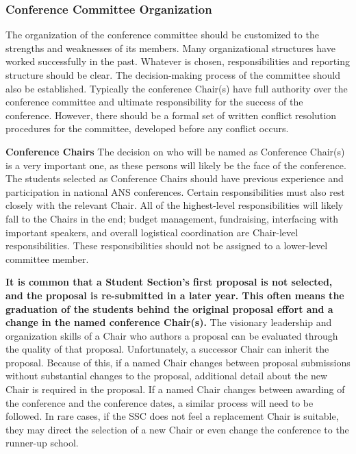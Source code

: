 \documentclass[12pt]{article}
\begin{document}
\subsubsection{Conference Committee Organization}

The organization of the conference committee should be customized to the strengths and
weaknesses of its members. Many organizational structures have worked successfully in the past. Whatever is chosen, responsibilities and reporting structure should be clear. The decision-making process of the committee should also be established. Typically the conference Chair(s) have full authority over the conference committee and ultimate responsibility for the success of the conference. However, there should be a formal set of written conflict resolution procedures for the committee, developed before any conflict occurs. 

\textbf{Conference Chairs} The decision on who will be named as Conference Chair(s) is a very important one, as these persons will likely be the face of the conference. 
The students selected as Conference Chairs should have previous experience and participation in national ANS conferences.
Certain responsibilities must also rest closely with the relevant Chair. All of the highest-level responsibilities will likely fall to the Chairs in the end; budget management, fundraising, interfacing with important speakers, and overall logistical coordination are Chair-level responsibilities. These responsibilities should not be assigned to a lower-level committee member.

\textbf{It is common that a Student Section’s first proposal is not selected, and the proposal is re-submitted in a later year. This often means the graduation of the students behind the original proposal effort and a change in the named conference Chair(s).} The visionary
leadership and organization skills of a Chair who authors a proposal can be evaluated
through the quality of that proposal. Unfortunately, a successor Chair can inherit the
proposal. Because of this, if a named Chair changes between proposal submissions
without substantial changes to the proposal, additional detail about the new Chair is
required in the proposal. If a named Chair changes between awarding of the conference
and the conference dates, a similar process will need to be followed. In rare cases, if the
SSC does not feel a replacement Chair is suitable, they may
direct the selection of a new Chair or even change the conference to the runner-up school.
\end{document}
